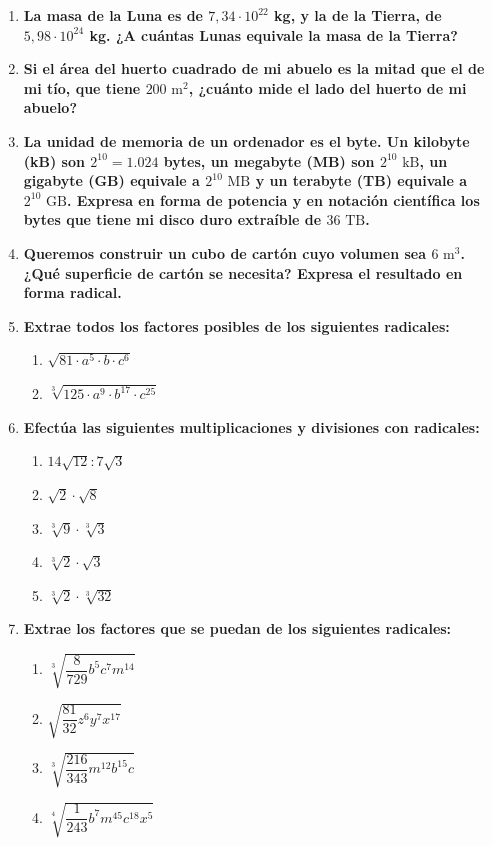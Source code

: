 \documentclass[a4paper,12pt]{article}
\begin{document}
\begin{enumerate}
    \item \textbf{La masa de la Luna es de $7,34 \cdot 10^{22}$ kg, y la de la Tierra, de $5,98 \cdot 10^{24}$ kg. ¿A cuántas Lunas equivale la masa de la Tierra?}

    \item \textbf{Si el área del huerto cuadrado de mi abuelo es la mitad que el de mi tío, que tiene $200\text{ m}^{2}$, ¿cuánto mide el lado del huerto de mi abuelo?}

    \item \textbf{La unidad de memoria de un ordenador es el byte. Un kilobyte (kB) son $2^{10} = 1.024$ bytes, un megabyte (MB) son $2^{10}\text{ kB}$, un gigabyte (GB) equivale a $2^{10}\text{ MB}$ y un terabyte (TB) equivale a $2^{10}\text{ GB}$. Expresa en forma de potencia y en notación científica los bytes que tiene mi disco duro extraíble de $36\text{ TB}$.}

    \item \textbf{Queremos construir un cubo de cartón cuyo volumen sea $6\text{ m}^{3}$. ¿Qué superficie de cartón se necesita? Expresa el resultado en forma radical.}

    \item \textbf{Extrae todos los factores posibles de los siguientes radicales:}
        \begin{enumerate}[label=\alph*)]
            \item $\sqrt{81 \cdot a^{5} \cdot b \cdot c^{6}}$
            \item $\sqrt[3]{125 \cdot a^{9} \cdot b^{17} \cdot c^{25}}$
        \end{enumerate}

    \item \textbf{Efectúa las siguientes multiplicaciones y divisiones con radicales:}
        \begin{enumerate}[label=\alph*)]
            \item $14\sqrt{12} : 7\sqrt{3}$
            \item $\sqrt{2} \cdot \sqrt{8}$
            \item $\sqrt[3]{9} \cdot \sqrt[3]{3}$
            \item $\sqrt[3]{2} \cdot \sqrt{3}$
            \item $\sqrt[3]{2} \cdot \sqrt[3]{32}$
        \end{enumerate}

    \item \textbf{Extrae los factores que se puedan de los siguientes radicales:}
        \begin{enumerate}[label=\alph*)]
            \item $\sqrt[3]{\dfrac{8}{729} b^{5} c^{7} m^{14}}$
            \item $\sqrt{\dfrac{81}{32} z^{6} y^{7} x^{17}}$
            \item $\sqrt[3]{\dfrac{216}{343} m^{12} b^{15} c}$
            \item $\sqrt[4]{\dfrac{1}{243} b^{7} m^{45} c^{18} x^{5}}$
        \end{enumerate}


\end{enumerate}
\end{document}

